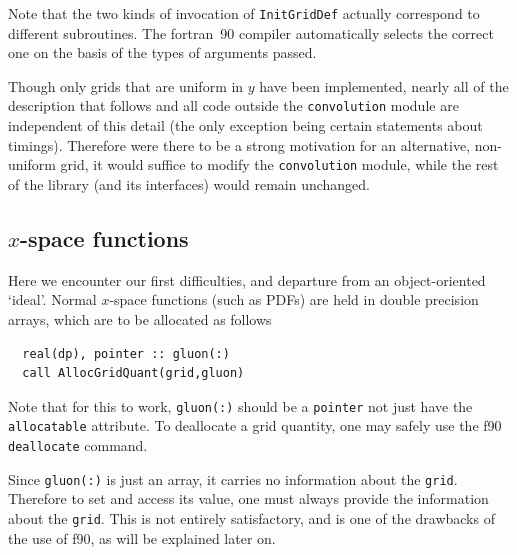 \documentclass[12pt]{article}
\newcommand{\ttt}[1]{\texttt{#1}}
\begin{document}
Note that the two kinds of invocation of \ttt{InitGridDef} actually
correspond to different subroutines. The fortran~90 compiler
automatically selects the correct one on the basis of the types of
arguments passed.

Though only grids that are uniform in $y$ have been implemented,
nearly all of the description that follows and all code outside the
\texttt{convolution} module are independent of this detail (the only
exception being certain statements about timings). Therefore were
there to be a strong motivation for an alternative, non-uniform grid,
it would suffice to modify the \texttt{convolution} module, while the
rest of the library (and its interfaces) would remain unchanged.

\subsection{$x$-space functions}
\label{sec:xspc}

Here we encounter our first difficulties, and departure from an
object-oriented `ideal'. Normal $x$-space functions (such as PDFs) are
held in double precision arrays, which are to be allocated as follows
\begin{verbatim}
  real(dp), pointer :: gluon(:)
  call AllocGridQuant(grid,gluon)
\end{verbatim}
Note that for this to work, \texttt{gluon(:)} should be a
\texttt{pointer} not just have the \texttt{allocatable} attribute. To
deallocate a grid quantity, one may safely use the f90
\texttt{deallocate} command.

Since \texttt{gluon(:)} is just an array, it carries no information
about the \texttt{grid}. Therefore to set and access its value, one
must always provide the information about the \texttt{grid}. This is
not entirely satisfactory, and is one of the drawbacks of the use of
f90, as will be explained later on.
\end{document}
